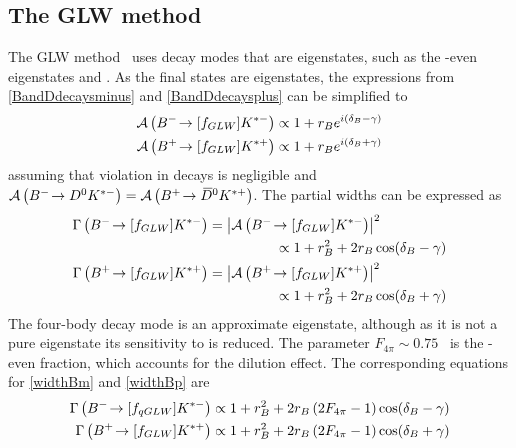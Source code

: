 \subsection{The GLW method}

The GLW method~\cite{GL,GW} uses \D decay modes that are \CP eigenstates, such as the \CP-even eigenstates \decay{\D}{\Kp\Km} and \decay{\D}{\pip\pim}. As the final states are \CP eigenstates, the expressions from \eqn\ref{BandDdecaysminus} and \ref{BandDdecaysplus} can be simplified to
\begin{align}
\mathcal{A}\left({{{B}^-}}\!\rightarrow [f_{GLW}]{\ensuremath{{K}^{*-}}}\right) &\propto 1 + r_B e^{i(\delta_B - \gamma)} \label{glwBdecaym} \\
\mathcal{A}\left({{{B}^+}}\!\rightarrow [f_{GLW}]{\ensuremath{{K}^{*+}}}\right) &\propto 1 + r_B e^{i(\delta_B + \gamma)} \label{glwBdecayp}
\end{align}
assuming that \CP violation in \D decays is negligible and $\mathcal{A}\left({{{B}^-}}\!\rightarrow {\ensuremath{{D}^0}}{\ensuremath{{K}^{*-}}}\right) = \mathcal{A}\left({{{B}^+}}\!\rightarrow {\ensuremath{{\kern 0.2em\overline{\kern -0.2em D}{}}{}^0}}{\ensuremath{{K}^{*+}}}\right)$. The partial widths can be expressed as
\begin{align}
\Gamma\left({{{B}^-}}\!\rightarrow [f_{GLW}]{\ensuremath{{K}^{*-}}}\right) &= \left|\mathcal{A}\left({{{B}^-}}\!\rightarrow [f_{GLW}]{\ensuremath{{K}^{*-}}}\right)\right|^2 \nonumber \\
&\hspace{48pt} \propto 1 + r_B^2 + 2r_B\cos(\delta_B - \gamma) \label{widthBm} \\
\Gamma\left({{{B}^+}}\!\rightarrow [f_{GLW}]{\ensuremath{{K}^{*+}}}\right) &= \left| \mathcal{A}\left({{{B}^+}}\!\rightarrow [f_{GLW}]{\ensuremath{{K}^{*+}}}\right)\right|^2 \nonumber \\
&\hspace{48pt} \propto 1 + r_B^2 + 2r_B\cos(\delta_B + \gamma) \label{widthBp}
\end{align}
The four-body \D decay mode \decay{\D}{\pip\pim\pip\pim} is an approximate \CP eigenstate, although as it is not a pure \CP eigenstate its sensitivity to \Pgamma is reduced. The parameter $F_{4\pi} \sim 0.75$~\cite{charm4pi} is the \CP-even fraction, which accounts for the dilution effect. The corresponding equations for \ref{widthBm} and \ref{widthBp} are
\begin{align}
\Gamma\left({{{B}^-}}\!\rightarrow [f_{qGLW}]{\ensuremath{{K}^{*-}}}\right) \propto 1 + r_B^2 + 2r_B\left(2F_{4\pi} - 1\right)\cos(\delta_B - \gamma) \label{widthBm4body} \\
\Gamma\left({{{B}^+}}\!\rightarrow [f_{GLW}]{\ensuremath{{K}^{*+}}}\right) \propto 1 + r_B^2 + 2r_B\left(2F_{4\pi} - 1\right)\cos(\delta_B + \gamma) \label{widthBp4body}
\end{align}



